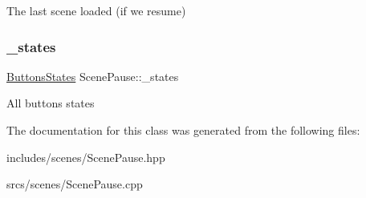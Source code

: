The last scene loaded (if we resume) \mbox{\label{class_scene_pause_ad4b208838d17f4f584e9bb592314425b}} 
\subsubsection{\texorpdfstring{\+\_\+states}{\_states}}
{\footnotesize\ttfamily \hyperlink{struct_scene_pause_1_1_buttons_states}{Buttons\+States} Scene\+Pause\+::\+\_\+states\hspace{0.3cm}{\ttfamily [protected]}}

All buttons states 

The documentation for this class was generated from the following files\+:\begin{DoxyCompactItemize}
\item 
includes/scenes/Scene\+Pause.\+hpp\item 
srcs/scenes/Scene\+Pause.\+cpp\end{DoxyCompactItemize}
